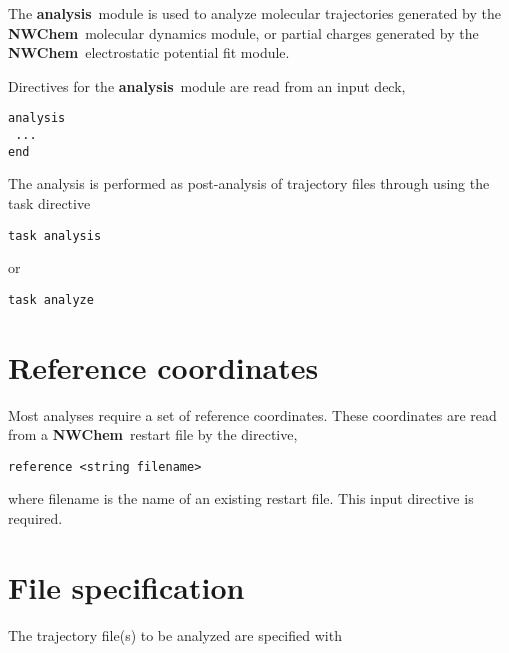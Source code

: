 \label{sec:analysis}
\def\bmu{\mbox{\boldmath $\mu$}}
\def\bE{\mbox{\bf E}}
\def\br{\mbox{\bf r}}
\def\tT{\tilde{T}}
\def\t{\tilde{1}}
\def\ip{i\prime}
\def\jp{j\prime}
\def\ipp{i\prime\prime}
\def\jpp{j\prime\prime}
\def\etal{{\sl et al.}}
\def\nwchem{{\bf NWChem}}
\def\nwargos{{\bf nwargos}}
\def\nwtop{{\bf nwtop}}
\def\nwrst{{\bf nwrst}}
\def\nwsgm{{\bf nwsgm}}
\def\esp{{\bf esp}}
\def\md{{\bf md}}
\def\prepare{{\bf prepare}}
\def\analysis{{\bf analysis}}
\def\argos{{\bf ARGOS}}
\def\amber{{\bf AMBER}}
\def\charmm{{\bf CHARMM}}
\def\discover{{\bf DISCOVER}}
\def\povray{{\bf povray}}
\def\gopenmol{{\bf gOpenMol}}
\def\ecce{{\bf ecce}}

The \analysis\ module is used to analyze molecular trajectories generated
by the \nwchem\ molecular dynamics module, or partial charges generated
by the \nwchem\ electrostatic potential fit module.

Directives for the \analysis\ module are read from an input deck,

\begin{verbatim}
analysis
 ...
end
\end{verbatim}

The analysis is performed  as post-analysis of trajectory files through 
using the {\rm task} directive

\begin{verbatim}
task analysis
\end{verbatim}
or
\begin{verbatim}
task analyze
\end{verbatim}

\section{Reference coordinates}

Most analyses require a set of reference coordinates. These
coordinates are read from a \nwchem\ restart file by the directive,

\begin{verbatim}
reference <string filename>
\end{verbatim}

where {\rm filename} is the name of an existing restart file. 
This input directive is required.

\section{File specification}

The trajectory file(s) to be analyzed are specified with

